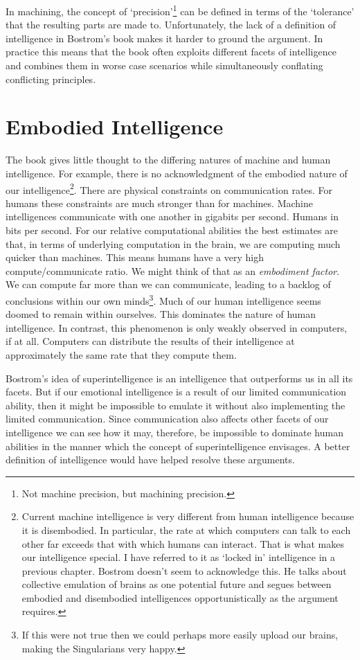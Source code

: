 \documentclass[a4paper]{caesar_book}
\begin{document}
In machining, the concept of ‘precision’\footnote{Not machine precision, but machining precision.} can be defined in terms of the ‘tolerance’ that the resulting parts are made to. Unfortunately, the lack of a definition of intelligence in Bostrom’s book makes it harder to ground the argument. In practice this means that the book often exploits different facets of intelligence and combines them in worse case scenarios while simultaneously conflating conflicting principles.

\section{Embodied Intelligence}

The book gives little thought to the differing natures of machine and human intelligence. For example, there is no acknowledgment of the embodied nature of our intelligence\footnote{Current machine intelligence is very different from human intelligence because it is disembodied. In particular, the rate at which computers can talk to each other far exceeds that with which humans can interact. That is what makes our intelligence special. I have referred to it as ‘locked in’ intelligence in a previous chapter. Bostrom doesn't seem to acknowledge this. He talks about collective emulation of brains as one potential future and segues between embodied and disembodied intelligences opportunistically as the argument requires.}. There are physical constraints on communication rates. For humans these constraints are much stronger than for machines. Machine intelligences communicate with one another in gigabits per second. Humans in bits per second. For our relative computational abilities the best estimates are that, in terms of underlying computation in the brain, we are computing much quicker than machines. This means humans have a very high compute/communicate ratio. We might think of that as an \textit{embodiment factor}. We can compute far more than we can communicate, leading to a backlog of conclusions within our own minds\footnote{If this were not true then we could perhaps more easily upload our brains, making the Singularians very happy.}. Much of our human intelligence seems doomed to remain within ourselves. This dominates the nature of human intelligence. In contrast, this phenomenon is only weakly observed in computers, if at all. Computers can distribute the results of their intelligence at approximately the same rate that they compute them.

Bostrom’s idea of superintelligence is an intelligence that outperforms us in all its facets. But if our emotional intelligence is a result of our limited communication ability, then it might be impossible to emulate it without also implementing the limited communication. Since communication also affects other facets of our intelligence we can see how it may, therefore, be impossible to dominate human abilities in the manner which the concept of superintelligence envisages. A better definition of intelligence would have helped resolve these arguments.
\end{document}
